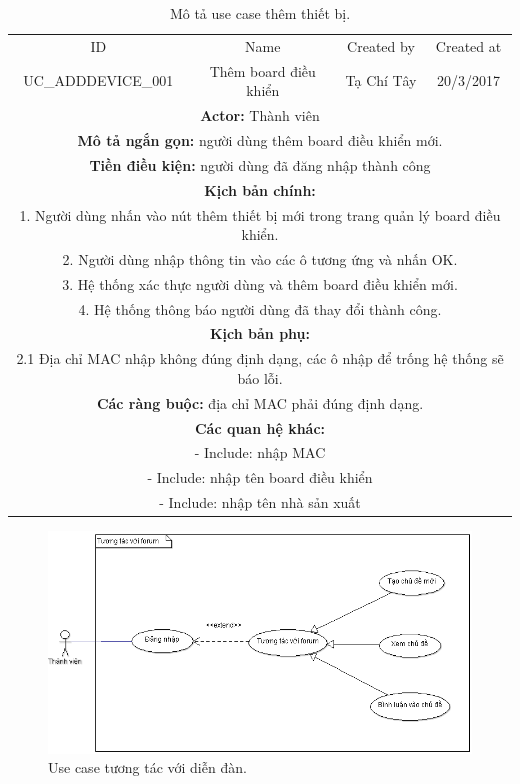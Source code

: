 \documentclass[a4paper,12pt,oneside]{article}
\begin{document}
\begin{table}[!htp]
\centering
\begin{tabularx}{\linewidth}{ |c||c|c|c| }
\hline
ID & Name & Created by & Created at\\
UC\_ADDDEVICE\_001 & Thêm board điều khiển & Tạ Chí Tây & 20/3/2017\\
\hline
\multicolumn{4}{|X|}{\textbf{Actor:} Thành viên }\\
\hline
\multicolumn{4}{|X|}{\textbf{Mô tả ngắn gọn:} người dùng thêm board điều khiển mới.}\\
\hline
\multicolumn{4}{|X|}{\textbf{Tiền điều kiện:} người dùng đã đăng nhập thành công}\\
\hline
\multicolumn{4}{|X|}{\textbf{Kịch bản chính:}}\\
\multicolumn{4}{|X|}{1. Người dùng nhấn vào nút thêm thiết bị mới trong trang quản lý board điều khiển.}\\
\multicolumn{4}{|X|}{
2.	Người dùng nhập thông tin vào các ô tương ứng và nhấn OK.}\\
\multicolumn{4}{|X|}{
3.	Hệ thống xác thực người dùng và thêm board điều khiển mới.}\\
\multicolumn{4}{|X|}{
4.	Hệ thống thông báo người dùng đã thay đổi thành công.}\\
\hline
\multicolumn{4}{|X|}{\textbf{Kịch bản phụ:}}\\
\multicolumn{4}{|X|}{2.1    Địa chỉ MAC nhập không đúng định dạng, các ô nhập để trống hệ thống sẽ báo lỗi.}\\
\hline
\multicolumn{4}{|X|}{\textbf{Các ràng buộc:} địa chỉ MAC phải đúng định dạng.}\\
\hline
\multicolumn{4}{|X|}{\textbf{Các quan hệ khác:}}\\
\multicolumn{4}{|X|}{- Include: nhập MAC}\\
\multicolumn{4}{|X|}{- Include: nhập tên board điều khiển}\\
\multicolumn{4}{|X|}{- Include: nhập tên nhà sản xuất}\\
\hline
\end{tabularx}
\caption{Mô tả use case thêm thiết bị.}
\end{table}

\begin{figure}[H]
	\centering
	\includegraphics[scale=.8]{hinh/newthread.png}
	\caption{Use case tương tác với diễn đàn.}
\end{figure}
\end{document}
